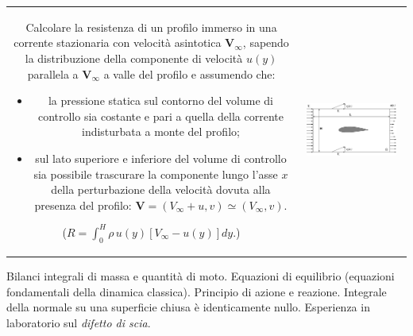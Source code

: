 \noindent
\begin{tabular}{cc}
\begin{minipage}{0.60\textwidth}
\begin{exerciseS}
Calcolare la resistenza di un profilo immerso in una corrente stazionaria 
con velocità asintotica ${\bm{V}}_\infty$, sapendo la distribuzione della 
componente di velocità $u(y)$ parallela a ${\bm{V}}_\infty$ a valle del 
profilo e assumendo che:
\begin{itemize}
\item la pressione statica sul contorno del volume di controllo
      sia costante e pari a quella della corrente indisturbata a monte
      del profilo;
\item sul lato superiore e inferiore del volume di controllo
      sia possibile trascurare la componente lungo l'asse $x$ della 
      perturbazione della velocit\`a dovuta alla presenza del profilo:
      $
      \bm{V} = (V_{\infty}+u,v) \simeq (V_{\infty},v).
      $
\end{itemize}
($R = \int_0^{ H}\rho \, u(y) [V_{\infty}-u(y)] dy.$)
\end{exerciseS}
\end{minipage}
&
\begin{minipage}{0.35\textwidth}
   \begin{center}
   \includegraphics[width=0.90\textwidth]{./fig/airfoil.eps}
   \end{center}
\end{minipage}
\end{tabular}

\vspace{1.0cm}

\sol

\partone
  Bilanci integrali di massa e quantità di moto. Equazioni di equilibrio (equazioni fondamentali della dinamica classica). Principio di azione e reazione. Integrale della normale su una superficie chiusa è identicamente nullo. Esperienza in laboratorio sul \textit{difetto di scia}.

